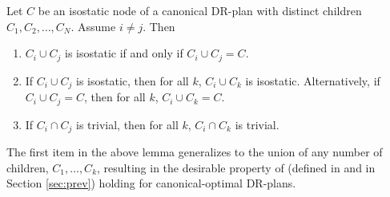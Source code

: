 \begin{lemma*}
\label{lemma:combined_lemma}
    Let $C$ be an isostatic node of a canonical DR-plan with distinct children $C_1,C_2,\ldots, C_N$. Assume $i\ne j$.
    Then
    \begin{enumerate}
        \item\label{lemma:wc_intersection_is_C}
        $C_i\cup C_j$ is isostatic if and only if $C_i\cup C_j = C$.

        \item\label{lemma:wc_intersection_makes_all_wc}
        If $C_i\cup C_j$ is isostatic, then for all $k$, $C_i\cup C_k$ is isostatic. Alternatively, if $C_i\cup C_j=C$, then for all $k$, $C_i\cup C_k=C$.

        \item\label{lemma:uc_intersection_makes_all_uc}
        If $C_i\cap C_j$ is trivial, then for all $k$, $C_i\cap C_k$ is trivial.
    \end{enumerate}
\end{lemma*}

\begin{remark}
    The first item in the above lemma generalizes to the union of any number of children, $C_1,\ldots,C_k$, resulting in the desirable property of  (defined in \cite{hoffman2001decompositionI} and in Section \ref{sec:prev}) holding for canonical-optimal DR-plans.
\end{remark}





%     
%     



